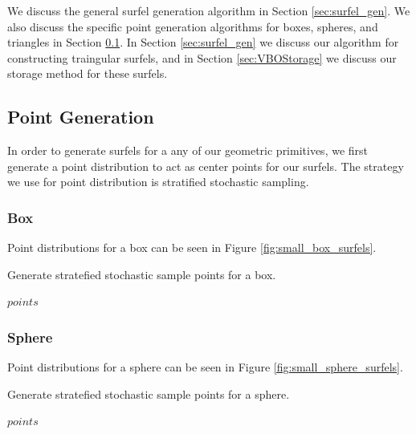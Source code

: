 We discuss the general surfel generation algorithm in Section \ref{sec:surfel_gen}. We also discuss the specific point generation algorithms for boxes, spheres, and triangles in Section \ref{sec:point_gen}. In Section \ref{sec:surfel_gen} we discuss our algorithm for constructing traingular surfels, and in Section \ref{sec:VBOStorage} we discuss our storage method for these surfels.

\subsection{Point Generation}
\label{sec:point_gen}

In order to generate surfels for a any of our geometric primitives, we first generate a point distribution to act as center points for our surfels. The strategy we use for point distribution is stratified stochastic sampling.

\subsubsection{Box}
\label{sec:box_point_gen}
Point distributions for a box can be seen in Figure \ref{fig:small_box_surfels}.

\begin{algorithm}[H]
\captionfont
\caption[Box point generation]{Generate stratefied stochastic sample points for a box.}
\label{alg:box_point_gen}
\begin{algorithmic}
      \State \Return $points$
   \EndFunction
\end{algorithmic}
\end{algorithm}

\subsubsection{Sphere}
\label{sec:sphere_point_gen}
Point distributions for a sphere can be seen in Figure \ref{fig:small_sphere_surfels}.

\begin{algorithm}[H]
\captionfont
\caption[Sphere point generation]{Generate stratefied stochastic sample points for a sphere.}
\label{alg:sphere_point_gen}
\begin{algorithmic}
      \State \Return $points$
   \EndFunction
\end{algorithmic}
\end{algorithm}

